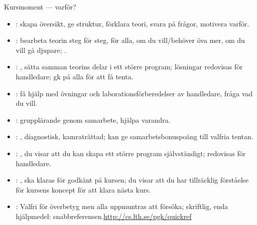 \begin{Slide}{Kursmoment --- varför?}\SlideFontTiny
\begin{itemize}

\item {}: skapa översikt, ge struktur, förklara teori, svara på frågor, motivera varför.

\item {}: bearbeta teorin steg för steg,  för alla,  om du vill/behöver öva mer,  om du vill gå djupare; .

\item {}: , sätta samman teorins delar i ett större program; lösningar redovisas för handledare; gk på alla för att få tenta.

\item {}: få hjälp med övningar och laborationsförberedelser av handledare, fråga vad du vill.

\item {}: grupplärande genom samarbete, hjälpa varandra.

\item {}: , diagnostisk, kamraträttad; kan ge samarbetsbonuspoäng till valfria tentan.

\item {}: , du visar att du kan skapa ett större program självständigt; redovisas för handledare.
\item {}: , ska klaras för godkänt på kursen; du visar att du har tillräcklig förståelse för kursens koncept för att klara nästa kurs. 

\item {}: Valfri för överbetyg men alla uppmuntras att försöka; skriftlig, enda hjälpmedel: snabbreferensen.\url{http://cs.lth.se/pgk/quickref}
\end{itemize}
\end{Slide}

